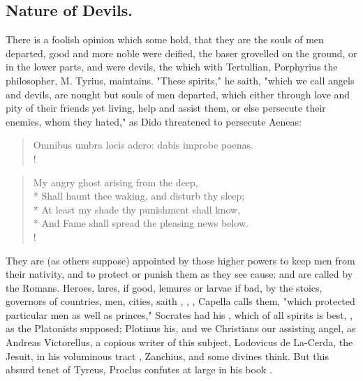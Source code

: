 \subsection{Nature of Devils.}

There is a foolish opinion which some hold, that they are the souls of men
departed, good and more noble were deified, the baser grovelled on the ground,
or in the lower parts, and were devils, the which with Tertullian, Porphyrius
the philosopher, M. Tyrius,  maintains. "These
spirits," he saith, "which we call angels and devils, are
nought but souls of men departed, which either through love and pity of their
friends yet living, help and assist them, or else persecute their enemies, whom
they hated," as Dido threatened to persecute Aeneas:

\begin{latin}
\begin{verse}%
Omnibus umbra locis adero: dabis improbe poenas.\\!
\end{verse}%
\end{latin}

\begin{verse}%
My angry ghost arising from the deep,\\*
Shall haunt thee waking, and disturb thy sleep;\\*
At least my shade thy punishment shall know,\\*
And Fame shall spread the pleasing news below.\\!
\end{verse}%

They are (as others suppose) appointed by those higher powers to keep men from
their nativity, and to protect or punish them as they see cause: and are called
 by the Romans. Heroes, lares, if good, lemures or
larvae if bad, by the stoics, governors of countries, men, cities, saith
\Apuleius, , \etc{} , Capella calls them,
"which protected particular men as well as princes," Socrates had his
, which of all spirits is best, , as the Platonists supposed; Plotinus
his, and we Christians our assisting angel, as Andreas Victorellus, a copious
writer of this subject, Lodovicus de La-Cerda, the Jesuit, in his voluminous
tract , Zanchius, and some divines
think. But this absurd tenet of Tyreus, Proclus confutes at large in his book
.

